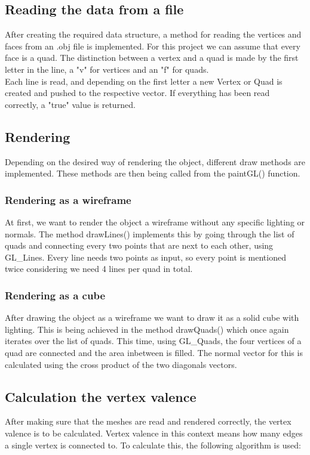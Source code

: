\documentclass[12pt,a4paper]{scrartcl}
\begin{document}
\subsection{Reading the data from a file}\label{subsec:read-data}
After creating the required data structure, a method for reading the vertices and faces from an .obj file is implemented. For this project we can assume that every face is a quad. The distinction between a vertex and a quad is made by the first letter in the line, a "v" for vertices and an "f" for quads. \\
Each line is read, and depending on the first letter a new Vertex or Quad is created and pushed to the respective vector.
If everything has been read correctly, a "true" value is returned.

\subsection{Rendering}\label{subsec:rendering}
Depending on the desired way of rendering the object, different draw methods are implemented. These methods are then being called from the paintGL() function.

\subsubsection{Rendering as a wireframe}
At first, we want to render the object a wireframe without any specific lighting or normals. The method drawLines() implements this by going through the list of quads and connecting every two points that are next to each other, using GL_Lines. Every line needs two points as input, so every point is mentioned twice considering we need 4 lines per quad in total.

\subsubsection{Rendering as a cube}
After drawing the object as a wireframe we want to draw it as a solid cube with lighting. This is being achieved in the method drawQuads() which once again iterates over the list of quads. This time, using GL_Quads, the four vertices of a quad are connected and the area inbetween is filled. The normal vector for this is calculated using the cross product of the two diagonals vectors.

\subsection{Calculation the vertex valence}
After making sure that the meshes are read and rendered correctly, the vertex valence is to be calculated. Vertex valence in this context means how many edges a single vertex is connected to. To calculate this, the following algorithm is used:
\end{document}
